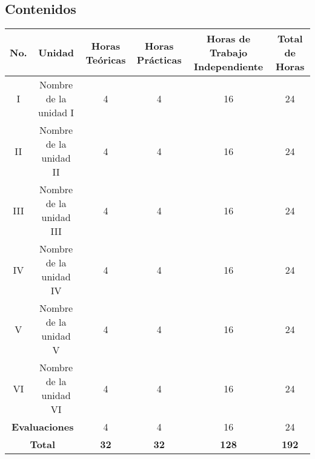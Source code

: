 \begin{landscape}
    \section{Contenidos}

    \begin{doublespace}
        \begin{adjustbox}{width=1.3847\textwidth}
            \begin{tabular}{ | c | c | c | c | c | c | }
                \hline
                \textbf{No.}                                & \textbf{Unidad}         & \textbf{Horas Teóricas} & \textbf{Horas Prácticas} & \textbf{Horas de Trabajo Independiente} & \textbf{Total de Horas} \\
                \hline
                I                                           & Nombre de la unidad I   & 4                       & 4                        & 16                                      & 24                      \\
                \hline
                II                                          & Nombre de la unidad II  & 4                       & 4                        & 16                                      & 24                      \\
                \hline
                III                                         & Nombre de la unidad III & 4                       & 4                        & 16                                      & 24                      \\
                \hline
                IV                                          & Nombre de la unidad IV  & 4                       & 4                        & 16                                      & 24                      \\
                \hline
                V                                           & Nombre de la unidad V   & 4                       & 4                        & 16                                      & 24                      \\
                \hline
                VI                                          & Nombre de la unidad VI  & 4                       & 4                        & 16                                      & 24                      \\
                \hline
                \multicolumn{2}{|c|}{\textbf{Evaluaciones}} & 4                       & 4                       & 16                       & 24                                                                \\
                \hline
                \multicolumn{2}{|c|}{\textbf{Total}}        & \textbf{32}             & \textbf{32}             & \textbf{128}             & \textbf{192}                                                      \\
                \hline
            \end{tabular}
        \end{adjustbox}
    \end{doublespace}
\end{landscape}
\pagebreak